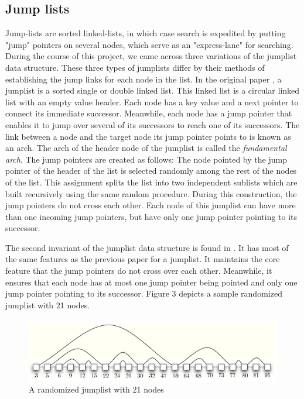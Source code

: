 \documentclass[oribibl]{llncs}
\begin{document}
\subsection{Jump lists}

Jump-lists \cite{jump_list} are sorted linked-lists, in which case search is expedited by putting "jump" pointers on several nodes, which serve as an "express-lane" for searching. During the course of this project, we came across three variations of the jumplist data structure. These three types of jumplists differ by their methods of establishing the jump links for each node in the list. In the original paper \cite{jump_list}, a jumplist is a sorted single or double linked list. This linked list is a circular linked list with an empty value header. Each node has a key value and a next pointer to connect its immediate successor. Meanwhile, each node has a jump pointer that enables it to jump over several of its successors to reach one of its successors. The link between a node and the target node its jump pointer points to is known as an arch. The arch of the header node of the jumplist is called the {\it fundamental arch}. The jump pointers are created as follows: The node pointed by the jump pointer of the header of the list is selected randomly among the rest of the nodes of the list. This assignment splits the list into two independent sublists which are built recursively using the same random procedure. During this construction, the jump pointers do not cross each other. Each node of this jumplist can have more than one incoming jump pointers, but have only one jump pointer pointing to its successor.

The second invariant of the jumplist data structure is found in \cite{skip_lift}. It has most of the same features as the previous paper for a jumplist. It maintains the core feature that the jump pointers do not cross over each other. Meanwhile, it ensures that each node has at most one jump pointer being pointed and only one jump pointer pointing to its successor. Figure 3 depicts a sample randomized jumplist with 21 nodes.


\begin{figure}[here]
\center
\includegraphics[width=15cm]{images/jumplist}
\caption{A randomized jumplist with 21 nodes}
\label{fig:jumplist}
\end{figure}
\end{document}
